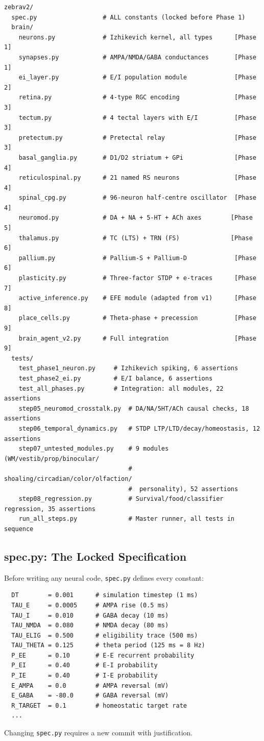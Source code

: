 \documentclass[11pt,a4paper]{article}
\begin{document}
\begin{verbatim}
zebrav2/
  spec.py                  # ALL constants (locked before Phase 1)
  brain/
    neurons.py             # Izhikevich kernel, all types      [Phase 1]
    synapses.py            # AMPA/NMDA/GABA conductances       [Phase 1]
    ei_layer.py            # E/I population module             [Phase 2]
    retina.py              # 4-type RGC encoding               [Phase 3]
    tectum.py              # 4 tectal layers with E/I          [Phase 3]
    pretectum.py           # Pretectal relay                   [Phase 3]
    basal_ganglia.py       # D1/D2 striatum + GPi              [Phase 4]
    reticulospinal.py      # 21 named RS neurons               [Phase 4]
    spinal_cpg.py          # 96-neuron half-centre oscillator  [Phase 4]
    neuromod.py            # DA + NA + 5-HT + ACh axes        [Phase 5]
    thalamus.py            # TC (LTS) + TRN (FS)              [Phase 6]
    pallium.py             # Pallium-S + Pallium-D             [Phase 6]
    plasticity.py          # Three-factor STDP + e-traces      [Phase 7]
    active_inference.py    # EFE module (adapted from v1)      [Phase 8]
    place_cells.py         # Theta-phase + precession          [Phase 9]
    brain_agent_v2.py      # Full integration                  [Phase 9]
  tests/
    test_phase1_neuron.py     # Izhikevich spiking, 6 assertions
    test_phase2_ei.py         # E/I balance, 6 assertions
    test_all_phases.py        # Integration: all modules, 22 assertions
    step05_neuromod_crosstalk.py  # DA/NA/5HT/ACh causal checks, 18 assertions
    step06_temporal_dynamics.py   # STDP LTP/LTD/decay/homeostasis, 12 assertions
    step07_untested_modules.py    # 9 modules (WM/vestib/prop/binocular/
                                  #  shoaling/circadian/color/olfaction/
                                  #  personality), 52 assertions
    step08_regression.py          # Survival/food/classifier regression, 35 assertions
    run_all_steps.py              # Master runner, all tests in sequence
\end{verbatim}

\subsection{spec.py: The Locked Specification}

Before writing any neural code, \texttt{spec.py} defines every constant:
\begin{verbatim}
  DT        = 0.001      # simulation timestep (1 ms)
  TAU_E     = 0.0005     # AMPA rise (0.5 ms)
  TAU_I     = 0.010      # GABA decay (10 ms)
  TAU_NMDA  = 0.080      # NMDA decay (80 ms)
  TAU_ELIG  = 0.500      # eligibility trace (500 ms)
  TAU_THETA = 0.125      # theta period (125 ms = 8 Hz)
  P_EE      = 0.10       # E-E recurrent probability
  P_EI      = 0.40       # E-I probability
  P_IE      = 0.40       # I-E probability
  E_AMPA    = 0.0        # AMPA reversal (mV)
  E_GABA    = -80.0      # GABA reversal (mV)
  R_TARGET  = 0.1        # homeostatic target rate
  ...
\end{verbatim}
Changing \texttt{spec.py} requires a new commit with justification.
\end{document}
